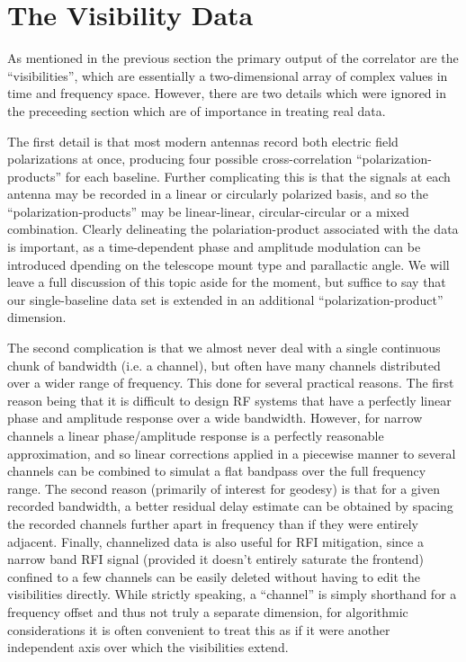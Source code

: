 \section{The Visibility Data}

As mentioned in the previous section the primary output of the correlator are the ``visibilities'', which are essentially a two-dimensional array of complex values in time and frequency space. However, there are two details which were ignored in the preceeding section which are of importance in treating real data. 

The first detail is that most modern antennas record both electric field polarizations at once, producing four possible cross-correlation ``polarization-products'' for each baseline. Further complicating this is that the signals at each antenna may be recorded in a linear or circularly polarized basis, and so the ``polarization-products'' may be linear-linear, circular-circular or a mixed combination. Clearly delineating the polariation-product associated with the data is important, as a 
time-dependent phase and amplitude modulation can be introduced dpending on the telescope mount type and parallactic angle. We will leave a full discussion of this topic aside for the moment, but suffice to say that our single-baseline data set is extended in an additional ``polarization-product'' dimension.

The second complication is that we almost never deal with a single continuous chunk of bandwidth (i.e. a channel), but often have many channels distributed over a wider range of frequency. This done for several practical reasons. The first reason being that it is difficult to design RF systems that have a perfectly linear phase and amplitude response over a wide bandwidth. However, for narrow channels a linear phase/amplitude response is a perfectly reasonable approximation, and so linear corrections applied in a piecewise manner to several channels can be combined to simulat a flat bandpass over the full frequency range. The second reason (primarily of interest for geodesy) is that for a given recorded bandwidth, a better residual delay estimate can be obtained by spacing the recorded channels further apart in frequency than if they were entirely adjacent. Finally, channelized data
is also useful for RFI mitigation, since a narrow band RFI signal (provided it doesn't entirely saturate the frontend)
confined to a few channels can be easily deleted without having to edit the visibilities directly. While strictly speaking, a ``channel'' is simply shorthand for a frequency offset and thus not truly a separate dimension, for algorithmic considerations it is often convenient to treat this as if it were another independent axis over which the visibilities extend.

